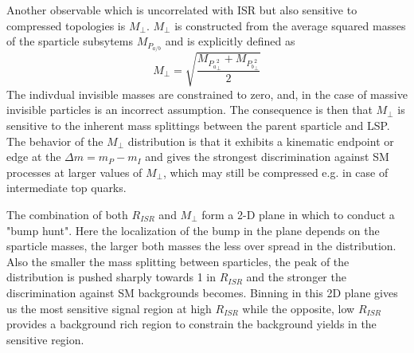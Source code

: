 Another observable which is uncorrelated with ISR but also sensitive to compressed topologies is $M_\perp$. $M_\perp$ is constructed from the average squared masses of the sparticle subsytems $M_{P_{a/b}}$ and is explicitly defined as
\begin{equation}
M_\perp = \sqrt{\frac{M_{P_a}_\perp^2 + M_{P_b}_\perp^2}{2}}
\end{equation}
The indivdual invisible masses are constrained to zero, and, in the case of massive invisible particles is an incorrect assumption. The consequence is then that $M_\perp$ is sensitive to the inherent mass splittings between the parent sparticle and LSP. The behavior of the $M_\perp$ distribution is that it exhibits a kinematic endpoint or edge at the $\Delta m = m_P - m_I$ and gives the strongest discrimination against SM processes at larger values of $M_\perp$, which may still be compressed e.g. in case of intermediate top quarks.

The combination of both $R_{ISR}$ and $M_\perp$ form a 2-D plane in which to conduct a "bump hunt". Here the localization of the bump in the plane depends on the sparticle masses, the larger both masses the less over spread in the distribution. Also the smaller the mass splitting between sparticles, the peak of the distribution is pushed sharply towards 1 in $R_{ISR}$ and the stronger the discrimination against SM backgrounds becomes. Binning in this 2D plane gives us the most sensitive signal region at high $R_{ISR}$  while the opposite, low $R_{ISR}$ provides a background rich region to constrain the background yields in the sensitive region. 


